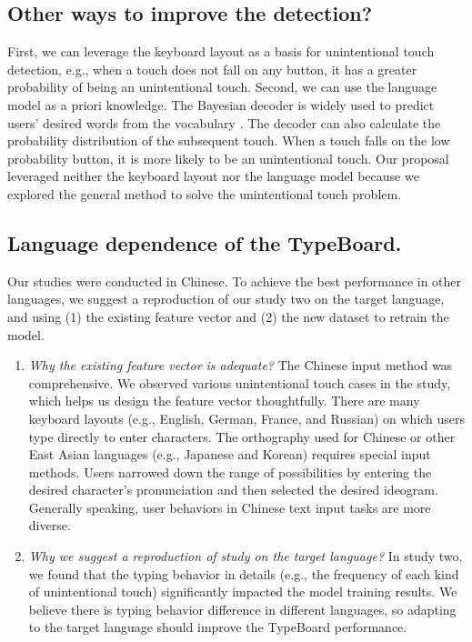 \subsection{Other ways to improve the detection?}

First, we can leverage the keyboard layout as a basis for unintentional touch detection, e.g., when a touch does not fall on any button, it has a greater probability of being an unintentional touch. Second, we can use the language model as a priori knowledge. The Bayesian decoder is widely used to predict users’ desired words from the vocabulary \cite{2018-Wristext, 2016-Watchwriter, 2019-Rotoswype, 2014-Vulture}. The decoder can also calculate the probability distribution of the subsequent touch. When a touch falls on the low probability button, it is more likely to be an unintentional touch. Our proposal leveraged neither the keyboard layout nor the language model because we explored the general method to solve the unintentional touch problem.


\subsection{Language dependence of the TypeBoard.}

Our studies were conducted in Chinese. To achieve the best performance in other languages, we suggest a reproduction of our study two on the target language, and using (1) the existing feature vector and (2) the new dataset to retrain the model.

\begin{enumerate}
	\item{\emph{Why the existing feature vector is adequate?} The Chinese input method was comprehensive. We observed various unintentional touch cases in the study, which helps us design the feature vector thoughtfully. There are many keyboard layouts (e.g., English, German, France, and Russian) on which users type directly to enter characters. The orthography used for Chinese or other East Asian languages (e.g., Japanese and Korean) requires special input methods. Users narrowed down the range of possibilities by entering the desired character's pronunciation and then selected the desired ideogram. Generally speaking, user behaviors in Chinese text input tasks are more diverse.}
	\item{\emph{Why we suggest a reproduction of study on the target language?} In study two, we found that the typing behavior in details (e.g., the frequency of each kind of unintentional touch) significantly impacted the model training results. We believe there is typing behavior difference in different languages, so adapting to the target language should improve the TypeBoard performance.}
\end{enumerate}

